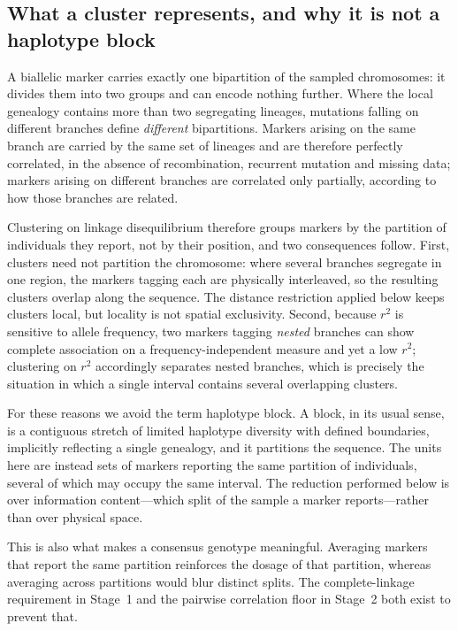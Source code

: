 \documentclass[11pt]{article}
\newcommand{\rsq}{\ensuremath{r^{2}}}
\begin{document}
\subsection{What a cluster represents, and why it is not a haplotype block}
A biallelic marker carries exactly one bipartition of the sampled chromosomes: it
divides them into two groups and can encode nothing further. Where the local
genealogy contains more than two segregating lineages, mutations falling on
different branches define \emph{different} bipartitions. Markers arising on the
same branch are carried by the same set of lineages and are therefore perfectly
correlated, in the absence of recombination, recurrent mutation and missing data;
markers arising on different branches are correlated only partially, according to
how those branches are related.

Clustering on linkage disequilibrium therefore groups markers by the partition of
individuals they report, not by their position, and two consequences follow.
First, clusters need not partition the chromosome: where several branches
segregate in one region, the markers tagging each are physically interleaved, so
the resulting clusters overlap along the sequence. The distance restriction
applied below keeps clusters local, but locality is not spatial exclusivity.
Second, because \rsq{} is sensitive to allele frequency, two markers tagging
\emph{nested} branches can show complete association on a frequency-independent
measure and yet a low \rsq{}; clustering on \rsq{} accordingly separates nested
branches, which is precisely the situation in which a single interval contains
several overlapping clusters.

For these reasons we avoid the term haplotype block. A block, in its usual sense,
is a contiguous stretch of limited haplotype diversity with defined boundaries,
implicitly reflecting a single genealogy, and it partitions the sequence. The
units here are instead sets of markers reporting the same partition of
individuals, several of which may occupy the same interval. The reduction
performed below is over information content---which split of the sample a marker
reports---rather than over physical space.

This is also what makes a consensus genotype meaningful. Averaging markers that
report the same partition reinforces the dosage of that partition, whereas
averaging across partitions would blur distinct splits. The complete-linkage
requirement in Stage~1 and the pairwise correlation floor in Stage~2 both exist to
prevent that.
\end{document}

